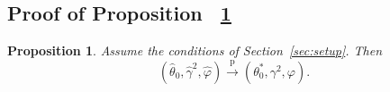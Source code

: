 \documentclass{article}
\newtheorem{proposition}[theorem]{Proposition}
\theoremstyle{definition}
\begin{document}
\begin{bibunit}
\subsection{Proof of Proposition~
\ref{prop:unknowns-o-identification-consistency}}
\label{sec:proof-unknowns-o-identification-consistency}

\begingroup
\renewcommand{\thetheorem}{\arabic{theorem}}
\renewcommand{\theproposition}{\arabic{theorem}}
\setcounter{theorem}{2}
\begin{proposition}
\label{prop:unknowns-o-identification-consistency}
Assume the conditions of Section~\ref{sec:setup}. Then
\begin{equation}
\label{eq:unknowns-o-consistency}
    (\widehat\theta_0,\widehat\gamma^2,\widehat\varphi)
    \overset{\mathrm p}{\longrightarrow}
    (\theta_0^*,\gamma^2,\varphi).
\end{equation}
\end{proposition}
\endgroup


\end{bibunit}
\end{document}

